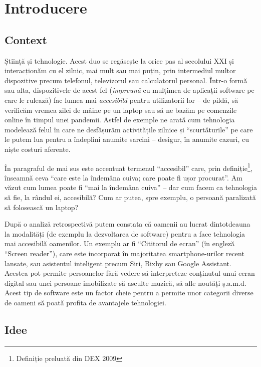 \chapter*{Introducere} 

\section*{Context}

Știință și tehnologie.
Acest duo se regăsește la orice pas al secolului XXI și interacționăm cu el zilnic, mai mult sau mai puțin, prin intermediul multor dispozitive precum telefonul, televizorul sau calculatorul personal.
Într-o formă sau alta, dispozitivele de acest fel (\emph{împreună} cu mulțimea de aplicații software pe care le rulează) fac lumea mai \emph{accesibilă} pentru utilizatorii lor – de pildă, să verificăm vremea zilei de mâine pe un laptop sau să ne bazăm pe comenzile online în timpul unei pandemii.
Astfel de exemple ne arată cum tehnologia modelează felul în care ne desfășurăm activitățile zilnice și ``scurtăturile'' pe care le putem lua pentru a îndeplini anumite sarcini – desigur, în anumite cazuri, cu niște costuri aferente.

În paragraful de mai sus este accentuat termenul ``accesibil'' care, prin definiție\footnote{Definiție preluată din DEX 2009}, înseamnă ceva ``care este la îndemâna cuiva; care poate fi ușor procurat''.
Am văzut cum lumea poate fi ``mai la îndemâna cuiva'' – dar cum facem ca tehnologia să fie, la rândul ei, accesibilă?
Cum ar putea, spre exemplu, o persoană paralizată să folosească un laptop?

După o analiză retrospectivă putem constata că oamenii au lucrat dintotdeauna la modalități (de exemplu la dezvoltarea de software) pentru a face tehnologia mai accesibilă oamenilor.
Un exemplu ar fi ``Cititorul de ecran'' (în engleză ``Screen reader''), care este incorporat în majoritatea smartphone-urilor recent lansate, sau asistentul inteligent precum Siri, Bixby sau Google Assistant.
Acestea pot permite persoanelor fără vedere să interpreteze conținutul unui ecran digital sau unei persoane imobilizate să asculte muzică, să afle noutăți ș.a.m.d.
Acest tip de software este un factor cheie pentru a permite unor categorii diverse de oameni să poată profita de avantajele tehnologiei.

\section*{Idee}

